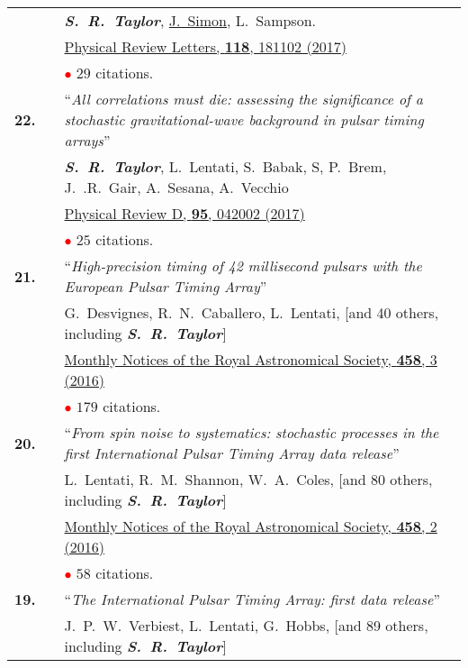 \documentclass[11pt,letterpaper,sans]{moderncv}
\begin{document}
{\begin{longtable}{rp{0.3cm}p{15.8cm}}
&& \textit{\textbf{S.~R.~Taylor}}, \underline{J.~Simon}, L.~Sampson. \\
&& \href{https://journals.aps.org/prl/abstract/10.1103/PhysRevLett.118.181102}{{\color{color1} Physical Review Letters, \textbf{118}, 181102 (2017)}} \\
&& \textcolor{red}{$\bullet$} $29$ citations. \vspace{0.09cm}\\
\textbf{22.} & & ``\textit{All correlations must die: assessing the significance of a stochastic gravitational-wave background in pulsar timing arrays}'' \\ 
&& \textit{\textbf{S.~R.~Taylor}},  L.~Lentati, S.~Babak, S, P.~Brem, J.~.R.~Gair, A.~Sesana, A.~Vecchio \\ 
&&  \href{https://journals.aps.org/prd/abstract/10.1103/PhysRevD.95.042002}{{\color{color1} Physical Review D, \textbf{95}, 042002 (2017)}} \\
&& \textcolor{red}{$\bullet$} $25$ citations. \vspace{0.09cm}\\
\textbf{21.} & & ``\textit{High-precision timing of 42 millisecond pulsars with the European Pulsar Timing Array}'' \\ 
&& G.~Desvignes, R.~N.~Caballero, L.~Lentati, [and 40 others, including \textit{\textbf{S.~R.~Taylor}}] \\ 
&&  \href{http://mnras.oxfordjournals.org/content/458/3/3341}{{\color{color1} Monthly Notices of the Royal Astronomical Society, \textbf{458}, 3 (2016)}} \\
&& \textcolor{red}{$\bullet$} $179$ citations. \vspace{0.09cm}\\
\textbf{20.} & & ``\textit{From spin noise to systematics: stochastic processes in the first International Pulsar Timing Array data release}'' \\ 
&& L.~Lentati, R.~M.~Shannon, W.~A.~Coles, [and 80 others, including \textit{\textbf{S.~R.~Taylor}}] \\ 
&&  \href{http://mnras.oxfordjournals.org/content/458/2/2161}{{\color{color1} Monthly Notices of the Royal Astronomical Society, \textbf{458}, 2 (2016)}} \\
&& \textcolor{red}{$\bullet$} $58$ citations. \vspace{0.09cm}\\
\textbf{19.} & & ``\textit{The International Pulsar Timing Array: first data release}'' \\ 
&& J.~P.~W.~Verbiest, L.~Lentati, G.~Hobbs, [and 89 others, including \textit{\textbf{S.~R.~Taylor}}] \\ 

\end{longtable}}
\end{document}
